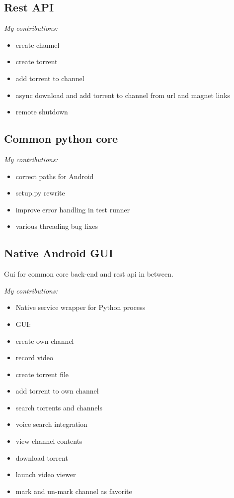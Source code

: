 \subsection{Rest API}

\emph{My contributions:}
\begin{itemize}
	\item create channel
	\item create torrent
	\item add torrent to channel
	\item async download and add torrent to channel from url and magnet links
	\item remote shutdown
\end{itemize}

\subsection{Common python core}

\emph{My contributions:}
\begin{itemize}
	\item correct paths for Android
	\item setup.py rewrite
	\item improve error handling in test runner
	\item various threading bug fixes
\end{itemize}


\subsection{Native Android GUI}
Gui for common core back-end and rest api in between.

\emph{My contributions:}
\begin{itemize}
	\item Native service wrapper for Python process
	\item GUI:
	\item create own channel
	\item record video
	\item create torrent file
	\item add torrent to own channel
	\item search torrents and channels
	\item voice search integration
	\item view channel contents
	\item download torrent
	\item launch video viewer
	\item mark and un-mark channel as favorite
\end{itemize}



